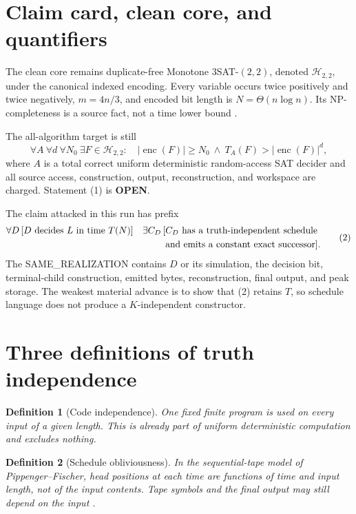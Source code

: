 \documentclass[11pt]{article}
\newtheorem{definition}{Definition}
\newcommand{\Htwo}{\mathcal H_{2,2}}
\newcommand{\OPEN}{\textbf{OPEN}}
\begin{document}
\section{Claim card, clean core, and quantifiers}

The clean core remains duplicate-free Monotone $3$SAT-$(2,2)$, denoted
$\Htwo$, under the canonical indexed encoding.  Every variable occurs twice
positively and twice negatively, $m=4n/3$, and encoded bit length is
$N=\Theta(n\log n)$.  Its NP-completeness is a source fact, not a time lower
bound \cite{doecker}.

The all-algorithm target is still
\[
 \forall A\ \forall d\ \forall N_0\ \exists F\in\Htwo:\quad
 |\operatorname{enc}(F)|\ge N_0
 \ \land\ T_A(F)>|\operatorname{enc}(F)|^d,             \tag{1}
\]
where $A$ is a total correct uniform deterministic random-access SAT decider
and all source access, construction, output, reconstruction, and workspace are
charged.  Statement (1) is \OPEN.

The claim attacked in this run has prefix
\begin{equation}
\begin{aligned}
 \forall D\,[D\text{ decides }L\text{ in time }T(N)]\quad
 \exists C_D\,[&C_D\text{ has a truth-independent schedule}\notag\\
                &\text{and emits a constant exact successor}].
\end{aligned}                                             \tag{2}
\end{equation}
The SAME\_REALIZATION contains $D$ or its simulation, the decision bit,
terminal-child construction, emitted bytes, reconstruction, final output,
and peak storage.  The weakest material advance is to show that (2) retains
$T$, so schedule language does not produce a $K$-independent constructor.

\section{Three definitions of truth independence}

\begin{definition}[Code independence]
One fixed finite program is used on every input of a given length.  This is
already part of uniform deterministic computation and excludes nothing.
\end{definition}

\begin{definition}[Schedule obliviousness]
In the sequential-tape model of Pippenger--Fischer, head positions at each
time are functions of time and input length, not of the input contents.  Tape
symbols and the final output may still depend on the input \cite{pf}.
\end{definition}
\end{document}
